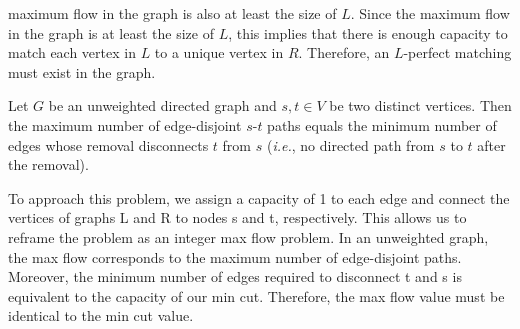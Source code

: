 \documentclass[11pt]{article}
\begin{document}
\begin{subparts}
\begin{solution}
    maximum flow in the graph is also at least the size of $L$. Since the maximum flow in the graph is at least the size of $L$, this implies that there is enough capacity to match each vertex in $L$ to a unique vertex in $R$. 
    Therefore, an $L$-perfect matching must exist in the graph.
\end{solution}
\newpage
\subpart
Let $G$ be an unweighted directed graph and $s,t \in V$ be two distinct vertices. Then the maximum number of
edge-disjoint $s$-$t$ paths equals the minimum number of edges whose removal disconnects $t$ from
$s$ (\textit{i.e.}, no directed path from $s$ to $t$ after the removal). 
\begin{solution}
    To approach this problem, we assign a capacity of 1 to each edge and connect the vertices of graphs L and R to nodes s and t, respectively. This allows us to reframe the problem as an integer max flow problem.
    In an unweighted graph, the max flow corresponds to the maximum number of edge-disjoint paths. Moreover, the minimum number of edges required to disconnect t and s is equivalent to the capacity of our min cut. Therefore, the max flow value must be identical to the min cut value.
\end{solution}
\end{subparts}
\end{document}
